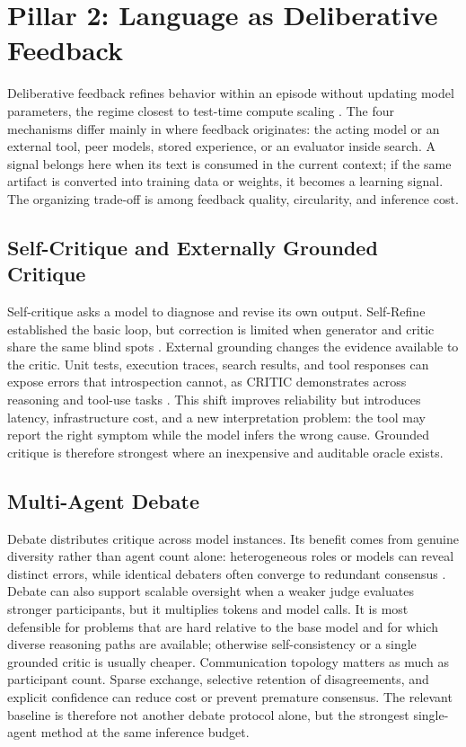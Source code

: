 \section{Pillar 2: Language as Deliberative Feedback}
\label{sec:deliberative}

Deliberative feedback refines behavior within an episode without updating model parameters, the regime closest to test-time compute scaling \citep{snell2024scaling}. The four mechanisms differ mainly in where feedback originates: the acting model or an external tool, peer models, stored experience, or an evaluator inside search. A signal belongs here when its text is consumed in the current context; if the same artifact is converted into training data or weights, it becomes a learning signal. The organizing trade-off is among feedback quality, circularity, and inference cost.

\subsection{Self-Critique and Externally Grounded Critique}
\label{subsec:critique}

Self-critique asks a model to diagnose and revise its own output. Self-Refine established the basic loop, but correction is limited when generator and critic share the same blind spots \citep{madaan2023selfrefine,kamoi2024can}. External grounding changes the evidence available to the critic. Unit tests, execution traces, search results, and tool responses can expose errors that introspection cannot, as CRITIC demonstrates across reasoning and tool-use tasks \citep{gou2024critic}. This shift improves reliability but introduces latency, infrastructure cost, and a new interpretation problem: the tool may report the right symptom while the model infers the wrong cause. Grounded critique is therefore strongest where an inexpensive and auditable oracle exists.

\subsection{Multi-Agent Debate}
\label{subsec:debate}

Debate distributes critique across model instances. Its benefit comes from genuine diversity rather than agent count alone: heterogeneous roles or models can reveal distinct errors, while identical debaters often converge to redundant consensus \citep{du2023debate,zhang2025stop}. Debate can also support scalable oversight when a weaker judge evaluates stronger participants, but it multiplies tokens and model calls. It is most defensible for problems that are hard relative to the base model and for which diverse reasoning paths are available; otherwise self-consistency or a single grounded critic is usually cheaper.
Communication topology matters as much as participant count. Sparse exchange, selective retention of disagreements, and explicit confidence can reduce cost or prevent premature consensus. The relevant baseline is therefore not another debate protocol alone, but the strongest single-agent method at the same inference budget.

